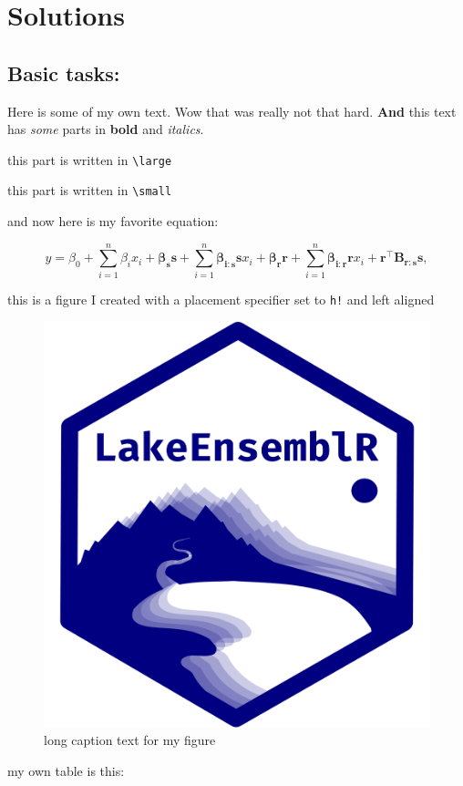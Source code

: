 \documentclass{article}
\numberwithin{equation}{section}
\begin{document}
\section{Solutions}\label{sec:solutions}

\subsection{Basic tasks:}

Here is some of my own text. Wow that was really not that hard. \textbf{And} this text has \textit{some} parts in \textbf{bold} and \textit{italics}.

{\large this part is written in \texttt{\textbackslash large}}

{\small this part is written in \texttt{\textbackslash small}}

and now here is my favorite equation:

\begin{equation}
	y = \beta_0 + \sum_{i=1}^{n}\beta_i  x_i +  \bm{\beta_{s}} \bm{s} +
	\sum_{i=1}^{n} \bm{\beta_{i:s}} \bm{s} x_i + \bm{\beta_{r}}  \bm{r} +
	\sum_{i=1}^{n} \bm{\beta_{i:r}} \bm{r} x_i + \bm{r}^\intercal \bm{B_{r:s}} \bm{s},
\end{equation}

this is a figure I created with a placement specifier set to \texttt{h!} and left aligned

\begin{figure}[h!]
	\raggedright
	\includegraphics[width=0.25\linewidth]{my_image}
	\caption[short text]{long caption text for my figure}
\end{figure}

my own table is this:
\end{document}
